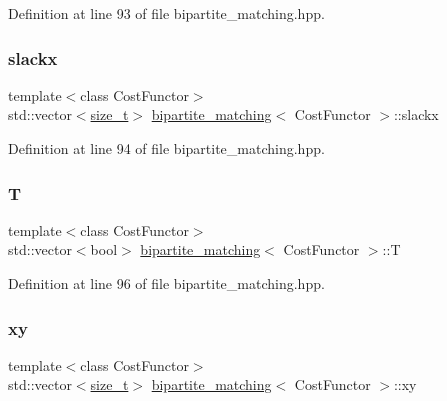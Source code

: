 Definition at line 93 of file bipartite\+\_\+matching.\+hpp.

\mbox{\label{classbipartite__matching_aa3307590ad084a72789e531408641181}} 
\subsubsection{\texorpdfstring{slackx}{slackx}}
{\footnotesize\ttfamily template$<$class Cost\+Functor$>$ \\
std\+::vector$<$\hyperlink{tutorial__fpt__2017_2intro_2sixth_2test_8c_a7c94ea6f8948649f8d181ae55911eeaf}{size\+\_\+t}$>$ \hyperlink{classbipartite__matching}{bipartite\+\_\+matching}$<$ Cost\+Functor $>$\+::slackx\hspace{0.3cm}{\ttfamily [private]}}



Definition at line 94 of file bipartite\+\_\+matching.\+hpp.

\mbox{\label{classbipartite__matching_a448041bbbf18ef18d985929d59d34411}} 
\subsubsection{\texorpdfstring{T}{T}}
{\footnotesize\ttfamily template$<$class Cost\+Functor$>$ \\
std\+::vector$<$bool$>$ \hyperlink{classbipartite__matching}{bipartite\+\_\+matching}$<$ Cost\+Functor $>$\+::T\hspace{0.3cm}{\ttfamily [private]}}



Definition at line 96 of file bipartite\+\_\+matching.\+hpp.

\mbox{\label{classbipartite__matching_ac16706259330acf8342f10e5c3fc11dc}} 
\subsubsection{\texorpdfstring{xy}{xy}}
{\footnotesize\ttfamily template$<$class Cost\+Functor$>$ \\
std\+::vector$<$\hyperlink{tutorial__fpt__2017_2intro_2sixth_2test_8c_a7c94ea6f8948649f8d181ae55911eeaf}{size\+\_\+t}$>$ \hyperlink{classbipartite__matching}{bipartite\+\_\+matching}$<$ Cost\+Functor $>$\+::xy\hspace{0.3cm}{\ttfamily [private]}}



